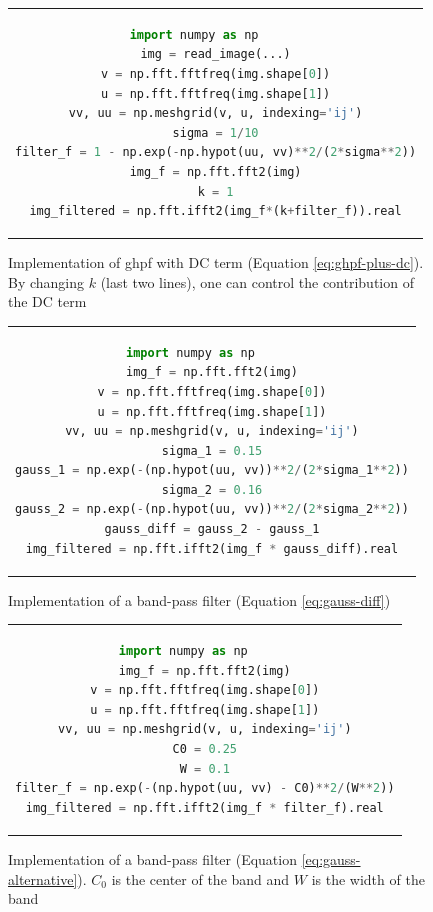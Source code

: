 \begin{figure}[htpb]
	\begin{tabular}{c}
	\begin{lstlisting}[language=Python]
import numpy as np		
img = read_image(...)
v = np.fft.fftfreq(img.shape[0])
u = np.fft.fftfreq(img.shape[1])
vv, uu = np.meshgrid(v, u, indexing='ij')
sigma = 1/10
filter_f = 1 - np.exp(-np.hypot(uu, vv)**2/(2*sigma**2))
img_f = np.fft.fft2(img)
k = 1
img_filtered = np.fft.ifft2(img_f*(k+filter_f)).real
	\end{lstlisting}
	\end{tabular}
	\caption[Example listing]{Implementation of \gls{ghpf} with DC term (Equation \ref{eq:ghpf-plus-dc}). By changing $k$ (last two lines), one can control the contribution of the DC term}
\label{code:ghpf-plus-dc}
\end{figure}

\begin{figure}[htpb]
	\begin{tabular}{c}
	\begin{lstlisting}[language=Python]
import numpy as np		
img_f = np.fft.fft2(img)
v = np.fft.fftfreq(img.shape[0])
u = np.fft.fftfreq(img.shape[1])
vv, uu = np.meshgrid(v, u, indexing='ij')
sigma_1 = 0.15
gauss_1 = np.exp(-(np.hypot(uu, vv))**2/(2*sigma_1**2))
sigma_2 = 0.16
gauss_2 = np.exp(-(np.hypot(uu, vv))**2/(2*sigma_2**2))
gauss_diff = gauss_2 - gauss_1
img_filtered = np.fft.ifft2(img_f * gauss_diff).real
	\end{lstlisting}
	\end{tabular}
	\caption[Example listing]{Implementation of a band-pass filter (Equation \ref{eq:gauss-diff})}
\label{code:gauss-diff}
\end{figure}

\begin{figure}[htpb]
	\begin{tabular}{c}
	\begin{lstlisting}[language=Python]
import numpy as np		
img_f = np.fft.fft2(img)
v = np.fft.fftfreq(img.shape[0])
u = np.fft.fftfreq(img.shape[1])
vv, uu = np.meshgrid(v, u, indexing='ij')
C0 = 0.25
W = 0.1
filter_f = np.exp(-(np.hypot(uu, vv) - C0)**2/(W**2))
img_filtered = np.fft.ifft2(img_f * filter_f).real
	\end{lstlisting}
	\end{tabular}
	\caption[Example listing]{Implementation of a band-pass filter (Equation \ref{eq:gauss-alternative}). $C_{0}$ is the center of the band and $W$ is the width of the band}
\label{code:bandpass-gauss-alternative}
\end{figure}

